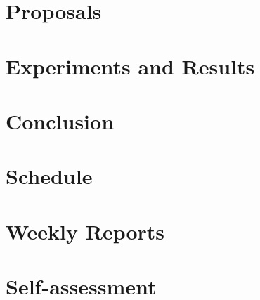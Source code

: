 \documentclass[11pt, english, screen, research-development]{report-rd-info}
\begin{document}
\chapter{Proposals}


\chapter{Experiments and Results}



\chapter{Conclusion}







\appendix
%

%

%

%


\chapter{Schedule}




\chapter{Weekly Reports}



\chapter{Self-assessment}

\end{document}
